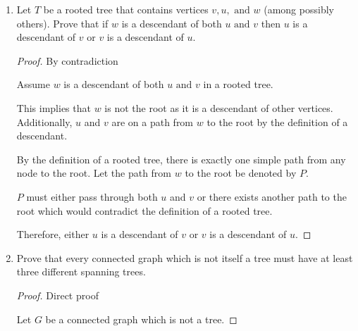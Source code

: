 \documentclass[11pt, letterpaper, includehead]{article}
\theoremstyle{plain}
\theoremstyle{mydefinition}
\theoremstyle{myproperty}
\begin{document}
\begin{enumerate}[label=\textbf{\arabic*}., leftmargin=*]
    \begin{proof} By contradiction

        Assume there exists a connected graph $G$ with $v$ vertices and $e$ edges that satisfies $v > e + 1$.
    
        We know every connected graph has a spanning tree. A spanning tree will have $v' = v$ vertices and $e' \leq e$ edges. 
        
        Thus the spanning tree will also have $v' > e' + 1$.

        But a tree must have $v = e + 1$, which is a contradiction, thus $G$ is not connected. 

        Therefore any graph with $v$ vertices and $e$ edges that satisfies $v > e + 1$ will NOT be connected.
    \end{proof}

    \item Let $T$ be a rooted tree that contains vertices $v, u, \text{ and } w$ (among possibly others). Prove that if $w$ is a descendant of both $u \text{ and } v$ then $u$ is a descendant of $v$ or $v$ is a descendant of $u$.
    
    \begin{proof} By contradiction

        Assume $w$ is a descendant of both $u \text{ and } v$ in a rooted tree.

        This implies that $w$ is not the root as it is a descendant of other vertices. Additionally, $u$ and $v$ are on a path from $w$ to the root by the definition of a descendant.

        By the definition of a rooted tree, there is exactly one simple path from any node to the root. Let the path from $w$ to the root be denoted by $P$.
    
        $P$ must either pass through both $u$ and $v$ or there exists another path to the root which would contradict the definition of a rooted tree.

        Therefore, either $u$ is a descendant of $v$ or $v$ is a descendant of $u$.    
    \end{proof}
    
    \item Prove that every connected graph which is not itself a tree must have at least three different spanning trees.

    \begin{proof} Direct proof

        Let $G$ be a connected graph which is not a tree.


\end{proof}
\end{enumerate}
\end{document}
